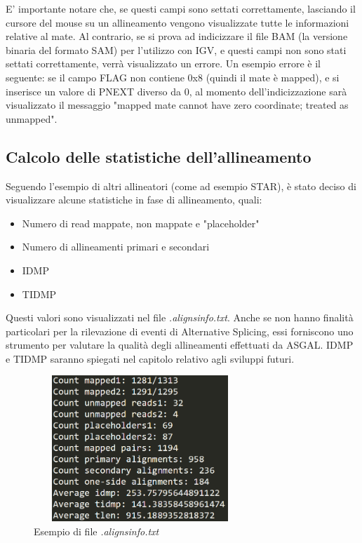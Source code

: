\newpage

E' importante notare che, se questi campi sono settati correttamente, lasciando il cursore del mouse su un allineamento vengono visualizzate tutte le informazioni relative al mate. Al contrario, se si prova ad indicizzare il file BAM (la versione binaria del formato SAM) per l'utilizzo con IGV, e questi campi non sono stati settati correttamente, verrà visualizzato un errore. Un esempio errore è il seguente: se il campo FLAG non contiene 0x8 (quindi il mate è mapped), e si inserisce un valore di PNEXT diverso da 0, al momento dell'indicizzazione sarà visualizzato il messaggio "mapped mate cannot have zero coordinate; treated as unmapped".

\subsection{Calcolo delle statistiche dell'allineamento}
Seguendo l'esempio di altri allineatori (come ad esempio STAR), è stato deciso di visualizzare alcune statistiche in fase di allineamento, quali:

\begin{itemize}
	\item Numero di read mappate, non mappate e "placeholder"
	\item Numero di allineamenti primari e secondari
	\item IDMP
	\item TIDMP
\end{itemize}

Questi valori sono visualizzati nel file \textit{.alignsinfo.txt}. Anche se non hanno finalità particolari per la rilevazione di eventi di Alternative Splicing, essi forniscono uno strumento per valutare la qualità degli allineamenti effettuati da ASGAL. IDMP e TIDMP saranno spiegati nel capitolo relativo agli sviluppi futuri.

\begin{figure}[h!]
	\centering
	\includegraphics[height=5.5cm,width=8cm]{images/aligninfo.png}
  \caption{Esempio di file \textit{.alignsinfo.txt}}
  \label{fig:AlignsInfo}
\end{figure}